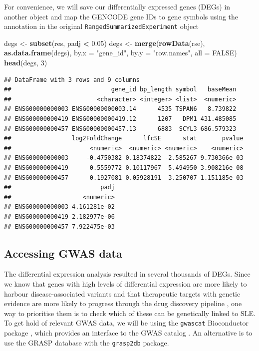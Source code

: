 \documentclass[9pt,a4paper,]{extarticle}
\newenvironment{Shaded}{\begin{snugshade}}{\end{snugshade}}
\newcommand{\KeywordTok}[1]{\textcolor[rgb]{0.13,0.29,0.53}{\textbf{#1}}}
\newcommand{\DataTypeTok}[1]{\textcolor[rgb]{0.13,0.29,0.53}{#1}}
\newcommand{\DecValTok}[1]{\textcolor[rgb]{0.00,0.00,0.81}{#1}}
\newcommand{\FloatTok}[1]{\textcolor[rgb]{0.00,0.00,0.81}{#1}}
\newcommand{\StringTok}[1]{\textcolor[rgb]{0.31,0.60,0.02}{#1}}
\newcommand{\OtherTok}[1]{\textcolor[rgb]{0.56,0.35,0.01}{#1}}
\newcommand{\OperatorTok}[1]{\textcolor[rgb]{0.81,0.36,0.00}{\textbf{#1}}}
\newcommand{\NormalTok}[1]{#1}
\theoremstyle{definition}
\theoremstyle{definition}
\theoremstyle{definition}
\theoremstyle{remark}
\begin{document}
For convenience, we will save our differentially expressed genes (DEGs) in another object and map the GENCODE gene IDs to gene symbols using the annotation in the original \texttt{RangedSummarizedExperiment} object

\begin{Shaded}
\begin{Highlighting}[]
\NormalTok{degs <-}\StringTok{ }\KeywordTok{subset}\NormalTok{(res, padj }\OperatorTok{<}\StringTok{ }\FloatTok{0.05}\NormalTok{)}
\NormalTok{degs <-}\StringTok{ }\KeywordTok{merge}\NormalTok{(}\KeywordTok{rowData}\NormalTok{(rse), }\KeywordTok{as.data.frame}\NormalTok{(degs), }\DataTypeTok{by.x =} \StringTok{"gene_id"}\NormalTok{, }\DataTypeTok{by.y =} \StringTok{"row.names"}\NormalTok{, }\DataTypeTok{all =} \OtherTok{FALSE}\NormalTok{)}
\KeywordTok{head}\NormalTok{(degs, }\DecValTok{3}\NormalTok{)}
\end{Highlighting}
\end{Shaded}

\begin{verbatim}
## DataFrame with 3 rows and 9 columns
##                            gene_id bp_length symbol   baseMean
##                        <character> <integer> <list>  <numeric>
## ENSG00000000003 ENSG00000000003.14      4535 TSPAN6   8.739822
## ENSG00000000419 ENSG00000000419.12      1207   DPM1 431.485085
## ENSG00000000457 ENSG00000000457.13      6883  SCYL3 686.579323
##                 log2FoldChange      lfcSE      stat       pvalue
##                      <numeric>  <numeric> <numeric>    <numeric>
## ENSG00000000003     -0.4750382 0.18374822 -2.585267 9.730366e-03
## ENSG00000000419      0.5559772 0.10117967  5.494950 3.908216e-08
## ENSG00000000457      0.1927081 0.05928191  3.250707 1.151185e-03
##                         padj
##                    <numeric>
## ENSG00000000003 4.161281e-02
## ENSG00000000419 2.182977e-06
## ENSG00000000457 7.922475e-03
\end{verbatim}

\subsection{Accessing GWAS data}\label{accessing-gwas-data}

The differential expression analysis resulted in several thousands of DEGs.
Since we know that genes with high levels of differential expression are more likely to harbour disease-associated variants \citep{Chen2008} and that therapeutic targets with genetic evidence are more likely to progress through the drug discovery pipeline \citep{Nelson2015}, one way to prioritise them is to check which of these can be genetically linked to SLE.
To get hold of relevant GWAS data, we will be using the \texttt{gwascat} Bioconductor package \citep{Carey2017a}, which provides an interface to the GWAS catalog \citep{MacArthur2017}.
An alternative is to use the GRASP \citep{Eicher2015} database with the \texttt{grasp2db} \citep{Carey2017b} package.
\end{document}
